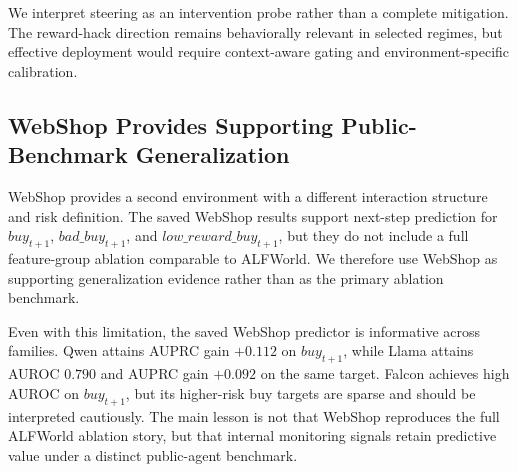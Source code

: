 \documentclass{article}
\theoremstyle{plain}
\theoremstyle{definition}
\theoremstyle{remark}
\begin{document}
We interpret steering as an intervention probe rather than a complete mitigation. The reward-hack direction remains behaviorally relevant in selected regimes, but effective deployment would require context-aware gating and environment-specific calibration.

\subsection{WebShop Provides Supporting Public-Benchmark Generalization}
\label{sec:webshop-support}

WebShop provides a second environment with a different interaction structure and risk definition. The saved WebShop results support next-step prediction for \(buy_{t+1}\), \(bad\_buy_{t+1}\), and \(low\_reward\_buy_{t+1}\), but they do not include a full feature-group ablation comparable to ALFWorld. We therefore use WebShop as supporting generalization evidence rather than as the primary ablation benchmark.

Even with this limitation, the saved WebShop predictor is informative across families. Qwen attains AUPRC gain \(+0.112\) on \(buy_{t+1}\), while Llama attains AUROC \(0.790\) and AUPRC gain \(+0.092\) on the same target. Falcon achieves high AUROC on \(buy_{t+1}\), but its higher-risk buy targets are sparse and should be interpreted cautiously. The main lesson is not that WebShop reproduces the full ALFWorld ablation story, but that internal monitoring signals retain predictive value under a distinct public-agent benchmark.

\begin{table}[t]
\centering
\caption{Saved WebShop next-step prediction results. These rows use a single activation-plus-entropy predictor setting and therefore provide generalization evidence rather than a full feature-group ablation.}
\label{tab:webshop-support}
\end{table}
\end{document}
